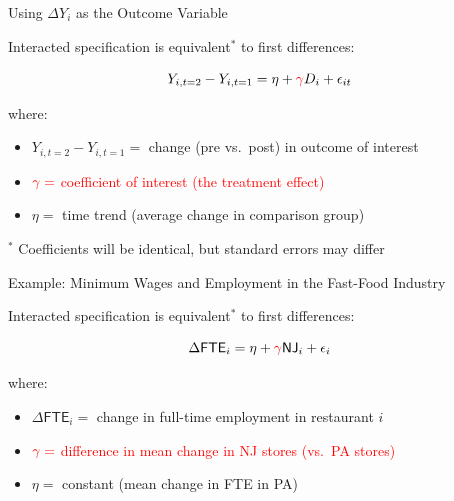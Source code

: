 \documentclass[10pt,xcolor=table,ignorenonframetext,aspectratio=169]{beamer}
\newlength{\wideitemsep}
\let\olditem\item
\renewcommand{\item}{\setlength{\itemsep}{\wideitemsep}\olditem}
\begin{document}
\begin{frame}{Using $\Delta Y_i$ as the Outcome Variable}


\medskip

Interacted specification is equivalent$^{\ast}$ to first differences:
\begin{small}
	\begin{equation*}
	Y_{i,t=2} - Y_{i,t=1} = \eta + \textcolor{red}{\gamma} D_i + \epsilon_{it}
	\end{equation*}
\end{small}
where:

\medskip
\begin{itemize}
	
	\item $Y_{i,t=2} - Y_{i,t=1} = $ change (pre vs.~post) in outcome of interest
	
	\item $\textcolor{red}{\gamma = } $ \textcolor{red}{coefficient of interest (the treatment effect)}
	
	\item $\eta = $ time trend (average change in comparison group)
	
\end{itemize}

\medskip
\medskip
\medskip
\footnotesize{$^{\ast}$ Coefficients will be identical, but standard errors may differ}

\end{frame}




\begin{frame}{Example:  Minimum Wages and Employment in the Fast-Food Industry}


\medskip

Interacted specification is equivalent$^{\ast}$ to first differences:
\begin{small}
	\begin{equation*}
	\Delta \textsf{FTE}_{i} = \eta + \textcolor{red}{\gamma} \textsf{NJ}_i + \epsilon_{i}
	\end{equation*}
\end{small}
where:

\medskip
\begin{itemize}
	
	\item $\Delta \textsf{FTE}_{i} = $ change in full-time employment in restaurant $i$
	
	\item $\textcolor{red}{\gamma =} $ \textcolor{red}{difference in mean change in NJ stores (vs.~PA stores)}
	
	\item $\eta = $ constant (mean change in FTE in PA)
	
\end{itemize}

\end{frame}
\end{document}
